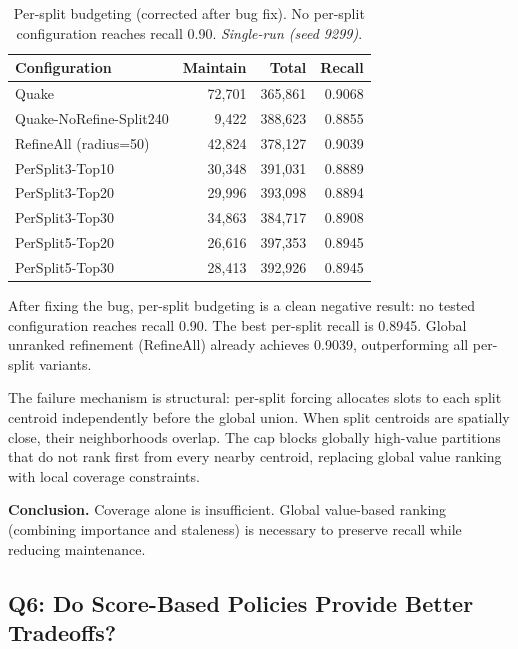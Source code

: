 \documentclass[sigconf, nonacm]{acmart}
\begin{document}
\begin{table}[h]
\centering
\caption{Per-split budgeting (corrected after bug fix).
  No per-split configuration reaches recall 0.90.
  \textit{Single-run (seed 9299)}.}
\label{tab:persplit}
\begin{tabular}{lrrr}
  \toprule
  Configuration & Maintain & Total & Recall \\
  \midrule
  Quake                        & 72,701 & 365,861 & 0.9068 \\
  Quake-NoRefine-Split240      &  9,422 & 388,623 & 0.8855 \\
  RefineAll (radius=50)        & 42,824 & 378,127 & 0.9039 \\
  PerSplit3-Top10              & 30,348 & 391,031 & 0.8889 \\
  PerSplit3-Top20              & 29,996 & 393,098 & 0.8894 \\
  PerSplit3-Top30              & 34,863 & 384,717 & 0.8908 \\
  PerSplit5-Top20              & 26,616 & 397,353 & 0.8945 \\
  PerSplit5-Top30              & 28,413 & 392,926 & 0.8945 \\
  \bottomrule
\end{tabular}
\end{table}

After fixing the bug, per-split budgeting is a clean negative result:
no tested configuration reaches recall 0.90. The best per-split recall
is 0.8945. Global unranked refinement (RefineAll) already achieves
0.9039, outperforming all per-split variants.

The failure mechanism is structural: per-split forcing allocates slots
to each split centroid independently before the global union. When
split centroids are spatially close, their neighborhoods overlap.
The cap blocks globally high-value partitions that do not rank first
from every nearby centroid, replacing global value ranking with
local coverage constraints.

\textbf{Conclusion.} Coverage alone is insufficient.
Global value-based ranking (combining importance and staleness)
is necessary to preserve recall while reducing maintenance.

\subsection{Q6: Do Score-Based Policies Provide Better Tradeoffs?}
\label{sec:eval_q6}
\end{document}
